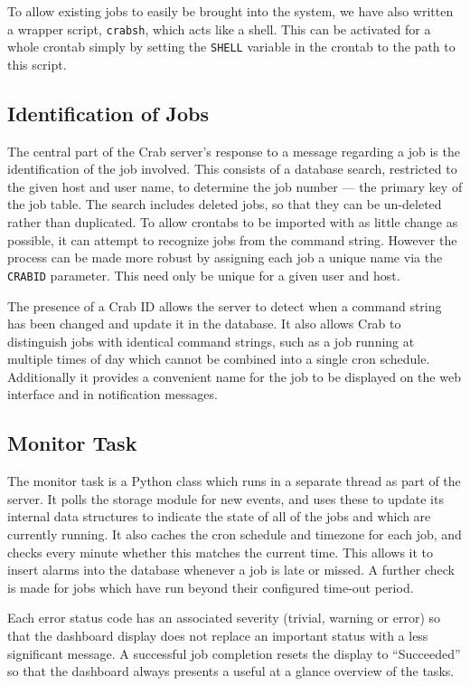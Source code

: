 To allow existing jobs to easily be brought into the system, we have also written a wrapper script, \texttt{crabsh}, which acts like a shell. This can be activated for a whole crontab simply by setting the \texttt{SHELL} variable in the crontab to the path to this script.

\subsection{Identification of Jobs}

The central part of the Crab server's response to a message regarding a job is the identification of the job involved. This consists of a database search, restricted to the given host and user name, to determine the job number --- the primary key of the job table. The search includes deleted jobs, so that they can be un-deleted rather than duplicated. To allow crontabs to be imported with as little change as possible, it can attempt to recognize jobs from the command string. However the process can be made more robust by assigning each job a unique name via the \texttt{CRABID} parameter. This need only be unique for a given user and host.

The presence of a Crab ID allows the server to detect when a command string has been changed and update it in the database. It also allows Crab to distinguish jobs with identical command strings, such as a job running at multiple times of day which cannot be combined into a single cron schedule. Additionally it provides a convenient name for the job to be displayed on the web interface and in notification messages.

\subsection{Monitor Task}

The monitor task is a Python class which runs in a separate thread as part of the server. It polls the storage module for new events, and uses these to update its internal data structures to indicate the state of all of the jobs and which are currently running. It also caches the cron schedule and timezone for each job, and checks every minute whether this matches the current time. This allows it to insert alarms into the database whenever a job is late or missed. A further check is made for jobs which have run beyond their configured time-out period.

Each error status code has an associated severity (trivial, warning or error) so that the dashboard display does not replace an important status with a less significant message. A successful job completion resets the display to ``Succeeded'' so that the dashboard always presents a useful at a glance overview of the tasks.

